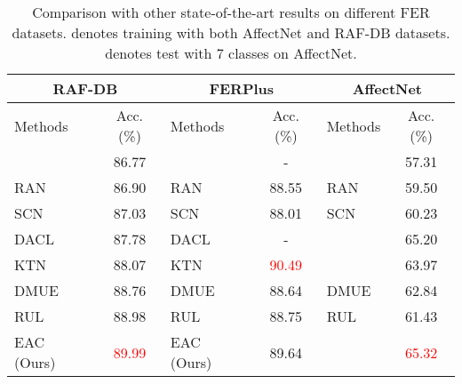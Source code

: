 \documentclass[runningheads]{llncs}
\begin{document}
\begin{table}[!t]
\setlength{\tabcolsep}{6pt}
\begin{center}
\caption{Comparison with other state-of-the-art results on different FER datasets.  denotes training with both AffectNet and RAF-DB datasets.  denotes test with 7 classes on AffectNet.}
\label{table:sota}
\begin{tabular}{lclclc}
\hline
\multicolumn{2}{c}{RAF-DB}              & \multicolumn{2}{c}{FERPlus}             & \multicolumn{2}{c}{AffectNet} \\ \hline
Methods    & Acc. (\%)                  & Methods    & Acc. (\%)                  & Methods        & Acc. (\%)    \\ \hline
 \cite{zeng2018facial}       & \multicolumn{1}{c|}{86.77} &   \cite{zeng2018facial}      & \multicolumn{1}{c|}{-} &  \cite{zeng2018facial}        & 57.31       \\
RAN\cite{wang2020region}        & \multicolumn{1}{c|}{86.90} &   RAN \cite{wang2020region}      & \multicolumn{1}{c|}{88.55} & RAN\cite{wang2020region}         & 59.50       \\
SCN\cite{wang2020suppressing}         & \multicolumn{1}{c|}{87.03} & SCN\cite{wang2020suppressing}          & \multicolumn{1}{c|}{88.01} &  SCN \cite{wang2020suppressing}          &  60.23       \\
DACL\cite{farzaneh2021facial}        & \multicolumn{1}{c|}{87.78} & DACL\cite{farzaneh2021facial}   & \multicolumn{1}{c|}{-} &  \cite{farzaneh2021facial}  & 65.20       \\
KTN\cite{li2021adaptively}        & \multicolumn{1}{c|}{88.07} & KTN\cite{li2021adaptively}   & \multicolumn{1}{c|}{\textcolor{red}{90.49}} &  \cite{li2021adaptively}  & 63.97      \\
DMUE\cite{she2021dive}       & \multicolumn{1}{c|}{88.76} & DMUE \cite{she2021dive}      & \multicolumn{1}{c|}{88.64} &  DMUE \cite{she2021dive}      &   62.84      \\
RUL\cite{zhang2021relative}        & \multicolumn{1}{c|}{88.98} & RUL\cite{zhang2021relative}   & \multicolumn{1}{c|}{88.75} &  RUL\cite{zhang2021relative}   & 61.43       \\

EAC (Ours) & \multicolumn{1}{c|}{\textcolor{red}{89.99}} & EAC (Ours) & \multicolumn{1}{c|}{89.64} &      & \textcolor{red}{65.32}        \\ \hline
\end{tabular}
\end{center}
\end{table}
\end{document}

